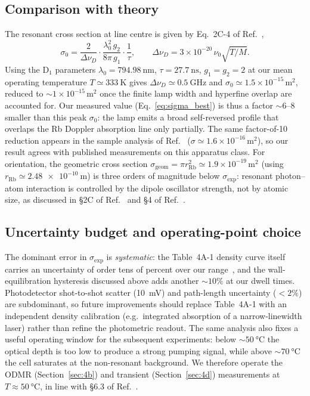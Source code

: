 \subsection{Comparison with theory}
The resonant cross section at line centre is given by Eq.~2C-4 of
Ref.~\cite{OpticalPumpingRubidium2002},
\begin{equation}
  \sigma_0 = \frac{2}{\Delta\nu_D}\cdot\frac{\lambda_0^2\,g_2}{8\pi\,g_1}\cdot\frac{1}{\tau},
  \qquad \Delta\nu_D = 3\times 10^{-20}\,\nu_0\sqrt{T/M}.
  \label{eq:sigma0_theory}
\end{equation}
Using the D$_1$ parameters $\lambda_0 = \SI{794.98}{\nano\meter}$,
$\tau = \SI{27.7}{\nano\second}$, $g_1=g_2=2$ at our mean operating
temperature $T \simeq \SI{333}{\kelvin}$ gives
$\Delta\nu_D \simeq \SI{0.5}{\giga\hertz}$ and
$\sigma_0 \simeq 1.5\times 10^{-15}\,\si{\meter\squared}$, reduced to
${\sim}1\times 10^{-15}\,\si{\meter\squared}$ once the finite lamp width
and hyperfine overlap are accounted for. Our measured value
(Eq.~\ref{eq:sigma_best}) is thus a factor ${\sim}6\text{--}8$ smaller
than this peak $\sigma_0$: the lamp emits a broad self-reversed profile
that overlaps the Rb Doppler absorption line only partially. The same
factor-of-10 reduction appears in the sample analysis of
Ref.~\cite{OpticalPumpingRubidium2002}
($\sigma \simeq 1.6\times 10^{-16}\,\si{\meter\squared}$), so our result
agrees with published measurements on this apparatus class. For
orientation, the geometric cross section
$\sigma_{\mathrm{geom}} = \pi r_{\mathrm{Rb}}^2 \simeq 1.9\times
  10^{-19}\,\si{\meter\squared}$ (using $r_{\mathrm{Rb}} \simeq
  \SI{2.48e-10}{\meter}$) is three orders of magnitude below
$\sigma_{\mathrm{exp}}$: resonant photon--atom interaction is controlled
by the dipole oscillator strength, not by atomic size, as discussed in
§2C of Ref.~\cite{OpticalPumpingRubidium2002} and
§4 of Ref.~\cite{OPTOpticalPumping2024}.

\subsection{Uncertainty budget and operating-point choice}
The dominant error in $\sigma_{\mathrm{exp}}$ is \emph{systematic}: the
Table~4A-1 density curve itself carries an uncertainty of order tens of
percent over our range~\cite{OpticalPumpingRubidium2002}, and the
wall-equilibration hysteresis discussed above adds another ${\sim}10\%$ at
our dwell times. Photodetector shot-to-shot scatter
(\SI{10}{\milli\volt}) and path-length uncertainty ($<2\%$) are
subdominant, so future improvements should replace Table~4A-1 with an
independent density calibration (e.g.\ integrated absorption of a
narrow-linewidth laser) rather than refine the photometric readout. The
same analysis also fixes a useful operating window for the subsequent
experiments: below ${\sim}\SI{50}{\celsius}$ the optical depth is too low
to produce a strong pumping signal, while above ${\sim}\SI{70}{\celsius}$
the cell saturates at the non-resonant background. We therefore operate
the ODMR (Section~\ref{sec:4b}) and transient (Section~\ref{sec:4d})
measurements at $T \approx \SI{50}{\celsius}$, in line with §6.3 of
Ref.~\cite{OPTOpticalPumping2024}.
